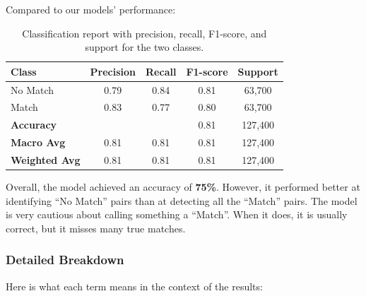 Compared to our models' performance:
\begin{table}[H]
    \centering
    \renewcommand{\arraystretch}{1.2}
    \begin{tabular}{lcccc}
        \toprule
        \textbf{Class}        & \textbf{Precision} & \textbf{Recall} & \textbf{F1-score} & \textbf{Support} \\
        \midrule
        No Match              & 0.79               & 0.84            & 0.81              & 63,700           \\
        Match                 & 0.83               & 0.77            & 0.80              & 63,700           \\
        \midrule
        \textbf{Accuracy}     &                    &                 & 0.81              & 127,400          \\
        \textbf{Macro Avg}    & 0.81               & 0.81            & 0.81              & 127,400          \\
        \textbf{Weighted Avg} & 0.81               & 0.81            & 0.81              & 127,400          \\
        \bottomrule
    \end{tabular}
    \caption{Classification report with precision, recall, F1-score, and support for the two classes.}
    \label{tab:classification_report2}
\end{table}
Overall, the model achieved an accuracy of \textbf{75\%}. However, it performed better at identifying ``No Match'' pairs than at detecting all the ``Match'' pairs. The model is very cautious about calling something a ``Match''. When it does, it is usually correct, but it misses many true matches.

\subsubsection*{Detailed Breakdown}

Here is what each term means in the context of the results:


